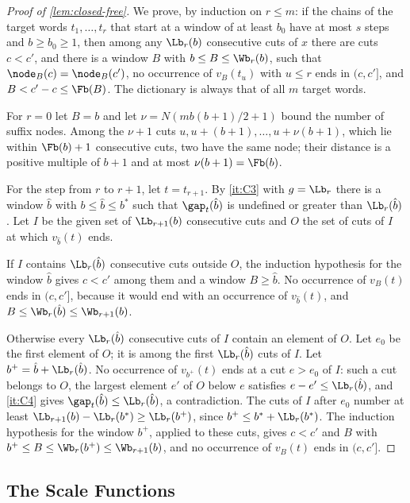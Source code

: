 \begin{proof}[Proof of \cref{lem:closed-free}]
We prove, by induction on $r\le m$: if the chains of the target words
$t_1,\dots,t_r$ that start at a window of at least $b_0$ have at most $s$
steps and $b\ge b_0\ge1$, then among any $\Lb_r(b)$ consecutive cuts of $x$
there are cuts $c<c'$, and there is a window $B$ with $b\le B\le\Wb_r(b)$,
such that $\node_B(c)=\node_B(c')$, no occurrence of $v_B(t_u)$ with $u\le r$
ends in $(c,c']$, and $B<c'-c\le\Fb(B)$. The dictionary is always that of
all $m$ target words.

For $r=0$ let $B=b$ and let $\nu=N(mb(b+1)/2+1)$ bound the number of suffix
nodes. Among the $\nu+1$ cuts $u,u+(b+1),\dots,u+\nu(b+1)$, which lie within
$\Fb(b)+1$ consecutive cuts, two have the same node; their distance is a
positive multiple of $b+1$ and at most $\nu(b+1)=\Fb(b)$.

For the step from $r$ to $r+1$, let $t=t_{r+1}$. By \ref{it:C3} with
$g=\Lb_r$ there is a window $\hat b$ with $b\le\hat b\le b^*$ such that
$\gap_t(\hat b)$ is undefined or greater than $\Lb_r(\hat b)$. Let $I$ be
the given set of $\Lb_{r+1}(b)$ consecutive cuts and $O$ the set of cuts of
$I$ at which $v_{\hat b}(t)$ ends.

If $I$ contains $\Lb_r(\hat b)$ consecutive cuts outside $O$, the induction
hypothesis for the window $\hat b$ gives $c<c'$ among them and a window
$B\ge\hat b$. No occurrence of $v_B(t)$ ends in $(c,c']$, because it would
end with an occurrence of $v_{\hat b}(t)$, and $B\le\Wb_r(\hat b)\le
\Wb_{r+1}(b)$.

Otherwise every $\Lb_r(\hat b)$ consecutive cuts of $I$ contain an element
of $O$. Let $e_0$ be the first element of $O$; it is among the first
$\Lb_r(\hat b)$ cuts of $I$. Let $b^+=\hat b+\Lb_r(\hat b)$. No occurrence
of $v_{b^+}(t)$ ends at a cut $e>e_0$ of $I$: such a cut belongs to $O$, the
largest element $e'$ of $O$ below $e$ satisfies $e-e'\le\Lb_r(\hat b)$, and
\ref{it:C4} gives $\gap_t(\hat b)\le\Lb_r(\hat b)$, a contradiction. The
cuts of $I$ after $e_0$ number at least $\Lb_{r+1}(b)-\Lb_r(b^*)\ge
\Lb_r(b^+)$, since $b^+\le b^*+\Lb_r(b^*)$. The induction hypothesis for the
window $b^+$, applied to these cuts, gives $c<c'$ and $B$ with $b^+\le
B\le\Wb_r(b^+)\le\Wb_{r+1}(b)$, and no occurrence of $v_B(t)$ ends in
$(c,c']$.
\end{proof}

\subsection{The Scale Functions}\label{app:tails-levels}

